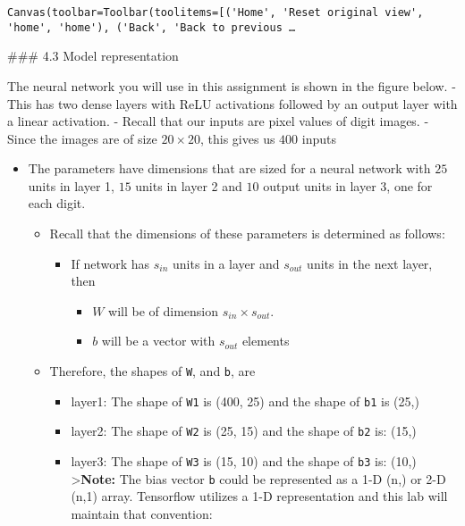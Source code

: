 \documentclass[11pt]{article}
\providecommand{\tightlist}{%
      \setlength{\itemsep}{0pt}\setlength{\parskip}{0pt}}
\begin{document}
    
    \begin{verbatim}
Canvas(toolbar=Toolbar(toolitems=[('Home', 'Reset original view', 'home', 'home'), ('Back', 'Back to previous …
    \end{verbatim}

    
    \#\#\# 4.3 Model representation

The neural network you will use in this assignment is shown in the
figure below. - This has two dense layers with ReLU activations followed
by an output layer with a linear activation. - Recall that our inputs
are pixel values of digit images. - Since the images are of size
\(20\times20\), this gives us \(400\) inputs

    \begin{itemize}
\item
  The parameters have dimensions that are sized for a neural network
  with \(25\) units in layer 1, \(15\) units in layer 2 and \(10\)
  output units in layer 3, one for each digit.

  \begin{itemize}
  \tightlist
  \item
    Recall that the dimensions of these parameters is determined as
    follows:

    \begin{itemize}
    \tightlist
    \item
      If network has \(s_{in}\) units in a layer and \(s_{out}\) units
      in the next layer, then

      \begin{itemize}
      \tightlist
      \item
        \(W\) will be of dimension \(s_{in} \times s_{out}\).
      \item
        \(b\) will be a vector with \(s_{out}\) elements
      \end{itemize}
    \end{itemize}
  \item
    Therefore, the shapes of \texttt{W}, and \texttt{b}, are

    \begin{itemize}
    \tightlist
    \item
      layer1: The shape of \texttt{W1} is (400, 25) and the shape of
      \texttt{b1} is (25,)
    \item
      layer2: The shape of \texttt{W2} is (25, 15) and the shape of
      \texttt{b2} is: (15,)
    \item
      layer3: The shape of \texttt{W3} is (15, 10) and the shape of
      \texttt{b3} is: (10,) \textgreater{}\textbf{Note:} The bias vector
      \texttt{b} could be represented as a 1-D (n,) or 2-D (n,1) array.
      Tensorflow utilizes a 1-D representation and this lab will
      maintain that convention:
    \end{itemize}
  \end{itemize}
\end{itemize}
\end{document}
